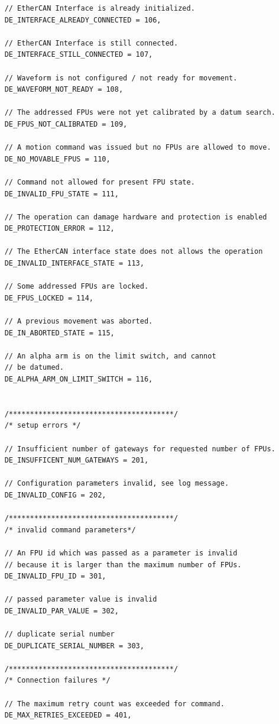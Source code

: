 \documentclass[fontsize=12,a4paper]{scrreprt}
\begin{document}
\begin{verbatim}
    // EtherCAN Interface is already initialized.
    DE_INTERFACE_ALREADY_CONNECTED = 106,

    // EtherCAN Interface is still connected.
    DE_INTERFACE_STILL_CONNECTED = 107,

    // Waveform is not configured / not ready for movement.
    DE_WAVEFORM_NOT_READY = 108,

    // The addressed FPUs were not yet calibrated by a datum search.
    DE_FPUS_NOT_CALIBRATED = 109,

    // A motion command was issued but no FPUs are allowed to move.
    DE_NO_MOVABLE_FPUS = 110,

    // Command not allowed for present FPU state.
    DE_INVALID_FPU_STATE = 111,

    // The operation can damage hardware and protection is enabled
    DE_PROTECTION_ERROR = 112,

    // The EtherCAN interface state does not allows the operation
    DE_INVALID_INTERFACE_STATE = 113,

    // Some addressed FPUs are locked.
    DE_FPUS_LOCKED = 114,

    // A previous movement was aborted.
    DE_IN_ABORTED_STATE = 115,

    // An alpha arm is on the limit switch, and cannot
    // be datumed.
    DE_ALPHA_ARM_ON_LIMIT_SWITCH = 116,


    /***************************************/
    /* setup errors */

    // Insufficient number of gateways for requested number of FPUs.
    DE_INSUFFICENT_NUM_GATEWAYS = 201,

    // Configuration parameters invalid, see log message.
    DE_INVALID_CONFIG = 202,

    /***************************************/
    /* invalid command parameters*/

    // An FPU id which was passed as a parameter is invalid
    // because it is larger than the maximum number of FPUs.
    DE_INVALID_FPU_ID = 301,

    // passed parameter value is invalid
    DE_INVALID_PAR_VALUE = 302,

    // duplicate serial number
    DE_DUPLICATE_SERIAL_NUMBER = 303,

    /***************************************/
    /* Connection failures */

    // The maximum retry count was exceeded for command.
    DE_MAX_RETRIES_EXCEEDED = 401,


\end{verbatim}
\end{document}
